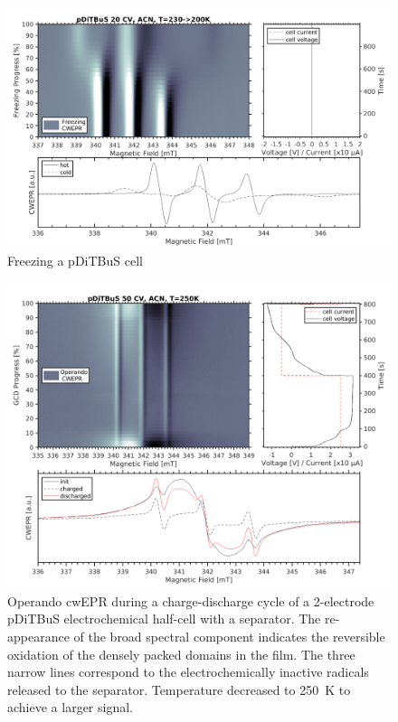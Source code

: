 \begin{figure}[h]
\center
	\includegraphics[width=1\textwidth]{./operando_epr/figures/CRYO/SANDWICH_FREEZING.pdf}
	\caption{Freezing a pDiTBuS cell}
	\label{fig:operando_cold_battery}
\end{figure}


\begin{figure}[h]
\center
	\includegraphics[width=1\textwidth]{./operando_epr/figures/slowcharge_231117_liquid_250K.pdf}
	\caption{Operando cwEPR during a charge-discharge cycle of a 2-electrode pDiTBuS electrochemical half-cell with a separator. The re-appearance of the broad spectral component indicates the reversible oxidation of the densely packed domains in the film. The three narrow lines correspond to the electrochemically inactive radicals released to the separator. Temperature decreased to 250~K to achieve a larger signal.}
	\label{fig:operando_cold_cycle}
\end{figure}


